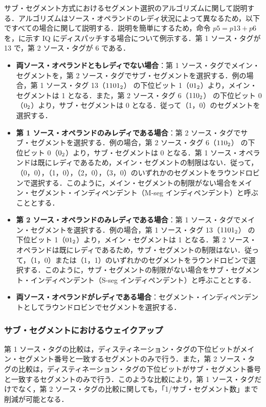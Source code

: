 サブ・セグメント方式におけるセグメント選択のアルゴリズムに関して説明する．アルゴリズムはソース・オペランドのレディ状況によって異なるため，以下ですべての場合に関して説明する．説明を簡単にするため，命令 $p5 = p13 + p6$ を，に示す IQ にディスパッチする場合について例示する．第 1 ソース・タグが 13 で，第 2 ソース・タグが 6 である．
\begin{itemize}
  \item \textbf{両ソース・オペランドともレディでない場合}：第 1 ソース・タグでメイン・セグメントを，第 2 ソース・タグでサブ・セグメントを選択する．例の場合，第 1 ソース・タグ 13（${\rm 1101_2}$） の下位ビット 1（${\rm 01_2}$）より，メイン・セグメントは 1 となる．また，第 2 ソース・タグ 6（${\rm 110_2}$） の下位ビット 0（${\rm 0_2}$）より，サブ・セグメントは 0 となる．従って（1，0）のセグメントを選択する． 
  \item \textbf{第 1 ソース・オペランドのみレディである場合}：第 2 ソース・タグでサブ・セグメントを選択する．例の場合，第 2 ソース・タグ 6（${\rm 110_2}$） の下位ビット 0（${\rm 0_2}$）より，サブ・セグメントは 0 となる．第 1 ソース・オペランドは既にレディであるため，メイン・セグメントの制限はない．従って，（0，0），（1，0），（2，0），（3，0）のいずれかのセグメントをラウンドロビンで選択する．このように，メイン・セグメントの制限がない場合をメイン・セグメント・インディペンデント（M-seg インディペンデント）と呼ぶこととする．
  \item \textbf{第 2 ソース・オペランドのみレディである場合}：第 1 ソース・タグでメイン・セグメントを選択する．例の場合，第 1 ソース・タグ 13（${\rm 1101_2}$） の下位ビット 1（${\rm 01_2}$）より，メイン・セグメントは 1 となる．第 2 ソース・オペランドは既にレディであるため，サブ・セグメントの制限はない．従って，（1，0）または（1，1）のいずれかのセグメントをラウンドロビンで選択する．このように，サブ・セグメントの制限がない場合をサブ・セグメント・インディペンデント（S-seg インディペンデント）と呼ぶこととする．
  \item \textbf{両ソース・オペランドがレディである場合}：セグメント・インディペンデントとしてラウンドロビンでセグメントを選択する．
\end{itemize}

\subsubsection{サブ・セグメントにおけるウェイクアップ}
第 1 ソース・タグの比較は，ディスティネーション・タグの下位ビットがメイン・セグメント番号と一致するセグメントのみで行う．また，第 2 ソース・タグの比較は，ディスティネーション・タグの下位ビットがサブ・セグメント番号と一致するセグメントのみで行う．このような比較により，第 1 ソース・タグだけでなく，第 2  ソース・タグの比較に関しても，「1/サブ・セグメント数」まで削減が可能となる．

